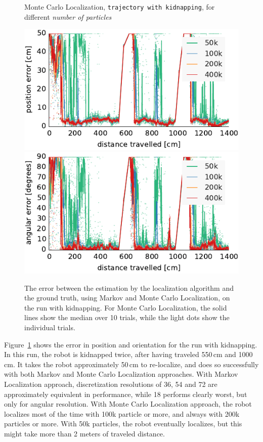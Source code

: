 \documentclass[letterpaper, 10pt, conference]{ieeeconf}
\newcommand{\Fig}[1]{Figure~\ref{fig:#1}}
\begin{document}
\begin{figure}
\begin{center}
Monte Carlo Localization, \texttt{trajectory with kidnapping}, for different \emph{number of particles}
\end{center}
\includegraphics{mcl-whole_random_long-xy}\hfill
\includegraphics{mcl-whole_random_long-theta}

\caption{The error between the estimation by the localization algorithm and the ground truth, using Markov and Monte Carlo Localization, on the run with kidnapping.
For Monte Carlo Localization, the solid lines show the median over 10 trials, while the light dots show the individual trials.}
\label{fig:whole-runs-random-long}
\end{figure}

\Fig{whole-runs-random-long} shows the error in position and orientation for the run with kidnapping.
In this run, the robot is kidnapped twice, after having traveled 550\,cm and 1000\,cm.
It takes the robot approximately 50\,cm to re-localize, and does so successfully with both Markov and Monte Carlo Localization approaches.
With Markov Localization approach, discretization resolutions of 36, 54 and 72 are approximately equivalent in performance, while 18 performs clearly worst, but only for angular resolution.
With Monte Carlo Localization approach, the robot localizes most of the time with 100k particle or more, and always with 200k particles or more.
With 50k particles, the robot eventually localizes, but this might take more than 2 meters of traveled distance.
\end{document}
